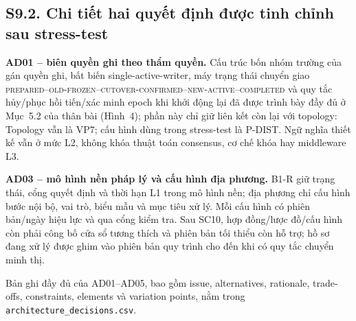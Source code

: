 \documentclass[a4paper,11pt]{article}
\begin{document}
\subsection*{S9.2. Chi tiết hai quyết định được tinh chỉnh sau stress-test}
\textbf{AD01 -- biên quyền ghi theo thẩm quyền.} Cấu trúc bốn nhóm trường của gán quyền ghi, bất biến single-active-writer, máy trạng thái chuyển giao \textsc{prepared--old-frozen--cutover-confirmed--new-active--completed} và quy tắc hủy/phục hồi tiến/xác minh epoch khi khởi động lại đã được trình bày đầy đủ ở Mục~5.2 của thân bài (Hình~4); phần này chỉ giữ liên kết còn lại với topology: Topology vẫn là VP7; cấu hình dùng trong stress-test là P-DIST. Ngữ nghĩa thiết kế vẫn ở mức L2, không khóa thuật toán consensus, cơ chế khóa hay middleware L3.

\textbf{AD03 -- mô hình nền pháp lý và cấu hình địa phương.} B1-R giữ trạng thái, cổng quyết định và thời hạn L1 trong mô hình nền; địa phương chỉ cấu hình bước nội bộ, vai trò, biểu mẫu và mục tiêu xử lý. Mỗi cấu hình có phiên bản/ngày hiệu lực và qua cổng kiểm tra. Sau SC10, hợp đồng/lược đồ/cấu hình còn phải công bố cửa sổ tương thích và phiên bản tối thiểu còn hỗ trợ; hồ sơ đang xử lý được ghim vào phiên bản quy trình cho đến khi có quy tắc chuyển minh thị.

Bản ghi đầy đủ của AD01--AD05, bao gồm issue, alternatives, rationale, trade-offs, constraints, elements và variation points, nằm trong \texttt{architecture\_decisions.csv}.
\end{document}

